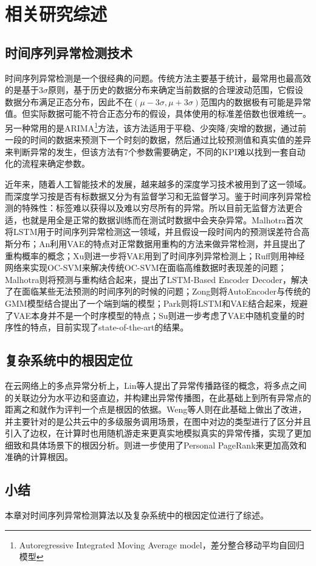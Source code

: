 
\chapter{相关研究综述}
\label{cha:intro}
\section{时间序列异常检测技术}
时间序列异常检测是一个很经典的问题。传统方法主要基于统计，最常用也最高效的是基于3$\sigma$原则，基于历史的数据分布来确定当前数据的合理波动范围，它假设数据分布满足正态分布，因此不在$(\mu - 3\sigma,\mu + 3\sigma)$范围内的数据极有可能是异常值。但实际数据可能不符合正态分布的假设，具体使用的标准差倍数也很难统一。另一种常用的是ARIMA\footnote{Autoregressive Integrated Moving Average model，差分整合移动平均自回归模型}方法，该方法适用于平稳、少突降/突增的数据，通过前一段的时间的数据来预测下一个时刻的数据，然后通过比较预测值和真实值的差异来判断异常的发生，但该方法有7个参数需要确定，不同的KPI难以找到一套自动化的流程来确定参数。

近年来，随着人工智能技术的发展，越来越多的深度学习技术被用到了这一领域。而深度学习按是否有标数据又分为有监督学习和无监督学习。鉴于时间序列异常检测的特殊性：标签难以获得以及难以穷尽所有的异常。所以目前无监督方法更合适，也就是用全是正常的数据训练而在测试时数据中会夹杂异常。Malhotra\cite{malhotra2015long}首次将LSTM用于时间序列异常检测这一领域，并且假设一段时间内的预测误差符合高斯分布；An\cite{an2015variational}利用VAE的特点对正常数据用重构的方法来做异常检测，并且提出了重构概率的概念；Xu\cite{xu2018unsupervised}则进一步将VAE用到了时间序列异常检测上；Ruff\cite{ruff2018deep}则用神经网络来实现OC-SVM来解决传统OC-SVM在面临高维数据时表现差的问题；Malhotra\cite{malhotra2016lstm}则将预测与重构结合起来，提出了LSTM-Based Encoder Decoder，解决了在面临某些无法预测的时间序列的时候的问题；Zong\cite{zong2018deep}则将AutoEncoder与传统的GMM模型结合提出了一个端到端的模型；Park\cite{park2018multimodal}则将LSTM和VAE结合起来，规避了VAE本身并不是一个时序模型的特点；Su\cite{su2019robust}则进一步考虑了VAE中随机变量的时序性的特点，目前实现了state-of-the-art的结果。

\section{复杂系统中的根因定位}

在云网络上的多点异常分析上，Lin\cite{lin2016automated}等人提出了异常传播路径的概念，将多点之间的关联边分为水平边和竖直边，并构建出异常传播图，在此基础上到所有异常点的距离之和就作为评判一个点是根因的依据。Weng\cite{weng2018root}等人则在此基础上做出了改进，并主要针对的是公共云中的多级服务调用场景，在图中对边的类型进行了区分并且引入了边权，在计算时也用随机游走来更真实地模拟真实的异常传播，实现了更加细致和具体场景下的根因分析。\cite{wu2020microrca}则进一步使用了Personal PageRank来更加高效和准确的计算根因。
\section{小结}
本章对时间序列异常检测算法以及复杂系统中的根因定位进行了综述。

